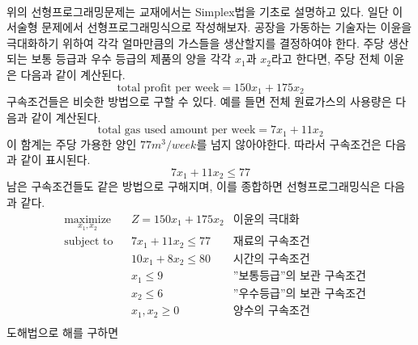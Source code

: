 \\위의 선형프로그래밍문제는 교재에서는 Simplex법을 기초로 설명하고 있다. 일단 이 서술형 문제에서 선형프로그래밍식으로 작성해보자.
공장을 가동하는 기술자는 이윤을 극대화하기 위하여 각각 얼마만큼의 가스들을 생산할지를 결정하여야 한다. 주당 생산되는 보통 등급과 우수 등급의 제품의 양을 각각 $x_{1}$과 $x_{2}$라고 한다면, 주당 전체 이윤은 다음과 같이 계산된다.
\begin{equation*}
\text{total profit per week}=150x_{1}+175x_{2}
\end{equation*}
구속조건들은 비슷한 방법으로 구할 수 있다. 예를 들면 전체 원료가스의 사용량은 다음과 같이 계산된다.
\begin{equation*}
\text{total gas used amount per week}=7x_{1}+11x_{2}
\end{equation*}
이 함계는 주당 가용한 양인 $77m^{3}/week$를 넘지 않아야한다. 따라서 구속조건은 다음 과 같이 표시된다.
\begin{equation*}
7x_{1}+11x_{2}\leq77
\end{equation*}
남은 구속조건들도 같은 방법으로 구해지며, 이를 종합하면 선형프로그래밍식은 다음과 같다.
\begin{equation*}
\begin{aligned}
& \underset{x_{1},x_{2}}{\text{maximize}}& & Z=150x_{1}+175x_{2}&\text{이윤의 극대화}\\
& \text{subject to}& & 7x_{1}+11x_{2}\leq 77&\text{재료의 구속조건}\\
& & & 10x_{1}+8x_{2}\leq 80&\text{시간의 구속조건}\\
& & & x_{1}\leq 9&\text{''보통등급''의 보관 구속조건}\\
& & & x_{2}\leq 6&\text{''우수등급''의 보관 구속조건}\\
& & & x_{1},x_{2}\geq 0&\text{양수의 구속조건}\\
\end{aligned}
\end{equation*}
도해법으로 해를 구하면
